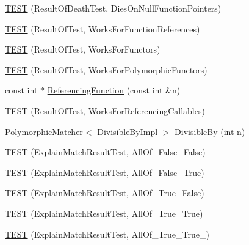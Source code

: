 \begin{DoxyCompactItemize}
\item 
\hyperlink{namespacetesting_1_1gmock__matchers__test_a4c929e5b46a503a9bb48c8b88dcbbf2a}{T\+E\+ST} (Result\+Of\+Death\+Test, Dies\+On\+Null\+Function\+Pointers)
\item 
\hyperlink{namespacetesting_1_1gmock__matchers__test_a1638ee6460100cbe21c65b6cdc06579a}{T\+E\+ST} (Result\+Of\+Test, Works\+For\+Function\+References)
\item 
\hyperlink{namespacetesting_1_1gmock__matchers__test_a19b7a39915f7ad5a0b741caf7ae4e619}{T\+E\+ST} (Result\+Of\+Test, Works\+For\+Functors)
\item 
\hyperlink{namespacetesting_1_1gmock__matchers__test_a976290e53e319b06c51a94f7e450d765}{T\+E\+ST} (Result\+Of\+Test, Works\+For\+Polymorphic\+Functors)
\item 
const int $\ast$ \hyperlink{namespacetesting_1_1gmock__matchers__test_af3164fc302e0b727c1eb745bdeb959f6}{Referencing\+Function} (const int \&n)
\item 
\hyperlink{namespacetesting_1_1gmock__matchers__test_a00ee08657c9e9e0c306be7b84cd2848c}{T\+E\+ST} (Result\+Of\+Test, Works\+For\+Referencing\+Callables)
\item 
\hyperlink{classtesting_1_1PolymorphicMatcher}{Polymorphic\+Matcher}$<$ \hyperlink{classtesting_1_1gmock__matchers__test_1_1DivisibleByImpl}{Divisible\+By\+Impl} $>$ \hyperlink{namespacetesting_1_1gmock__matchers__test_ac5b1fd3b6a8141c7e83ef6040ed4630f}{Divisible\+By} (int n)
\item 
\hyperlink{namespacetesting_1_1gmock__matchers__test_aa9a60a406d9f495de8c8552abf577dd1}{T\+E\+ST} (Explain\+Match\+Result\+Test, All\+Of\+\_\+\+False\+\_\+\+False)
\item 
\hyperlink{namespacetesting_1_1gmock__matchers__test_a099aebb5417d5bd85e11aefe935ec345}{T\+E\+ST} (Explain\+Match\+Result\+Test, All\+Of\+\_\+\+False\+\_\+\+True)
\item 
\hyperlink{namespacetesting_1_1gmock__matchers__test_a5d386691eaed59994a1d2b65f94b23a9}{T\+E\+ST} (Explain\+Match\+Result\+Test, All\+Of\+\_\+\+True\+\_\+\+False)
\item 
\hyperlink{namespacetesting_1_1gmock__matchers__test_a16545b298640b253502d604f52ea95e2}{T\+E\+ST} (Explain\+Match\+Result\+Test, All\+Of\+\_\+\+True\+\_\+\+True)
\item 
\hyperlink{namespacetesting_1_1gmock__matchers__test_af1ba4010a24716a51a302f9a518023b5}{T\+E\+ST} (Explain\+Match\+Result\+Test, All\+Of\+\_\+\+True\+\_\+\+True\+\_)
\item 

\end{DoxyCompactItemize}
